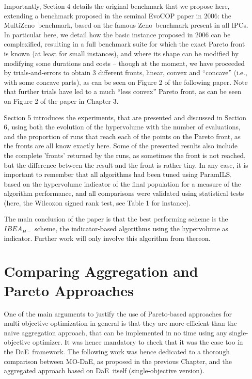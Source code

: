 \documentclass[english]{DESCARWINreport}
\newcounter{hyp}
\newcounter{con}
\def\DAE{{\sc DaE}}
\def\MODAE{{\sc MO-DaE}}
\def\ZENO{{\sc Zeno}}
\def\MULTIZENO{{\sc MultiZeno}}
\def\PARAMILS{{\sc ParamILS}}
\begin{document}
Importantly, Section 4 details the original benchmark that we propose here, extending a benchmark proposed in the seminal EvoCOP paper in 2006: the \MULTIZENO\ benchmark, based on the famous \ZENO\ benchmark present in all IPCs. In particular here, we detail how the basic instance proposed in 2006 can be complexified, resulting in a full benchmark suite for which the exact Pareto front is known (at least for small instances), and where its shape can be modified by modifying some durations and costs -- though at the moment, we have proceeded by trials-and-errors to obtain 3 different fronts, linear, convex and ``concave'' (i.e., with some concave parts), as can be seen on Figure 2 of the following paper. Note that further trials have led to a much ``less convex'' Pareto front, as can be seen on Figure 2 of the paper in Chapter 3.

Section 5 introduces the experiments, that are presented and discussed in Section 6, using both the evolution of the hypervolume with the number of evaluations, and the proportion of runs that reach each of the points on the Pareto front, as the fronts are all know exactly here. Some of the presented results also include the complete 'fronts' returned by the runs, as sometimes the front is not reached, but the difference between the result and the front is rather tiny. In any case, it is important to remember that all algorithms had been tuned using \PARAMILS, based on the hypervolume indicator of the final population for a measure of the algorithm performance, and all comparisons were validated using statistical tests (here, the Wilcoxon signed rank test, see Table 1 for instance).

The main conclusion of the paper is that the best performing scheme is the $IBEA_{H-}$ scheme, the indicator-based algorithms using the hypervolume as indicator. Further work will only involve this algorithm from thereon. 


\newpage
\hoffset 0cm

\newpage
\hoffset -2cm

\chapter{Comparing Aggregation and Pareto Approaches}

One of the main arguments to justify the use of Pareto-based approaches for multi-objective optimization in general is that they are more efficient than the naive aggregation approach, that can be implemented in no time using any single-objective optimizer. It was hence mandatory to check that it was the case too in the \DAE\ framework. The following work was hence dedicated to a thorough comparison between \MODAE, as proposed in the previous Chapter, and the aggregated approach based on \DAE\ itself (single-objective version).
\end{document}
